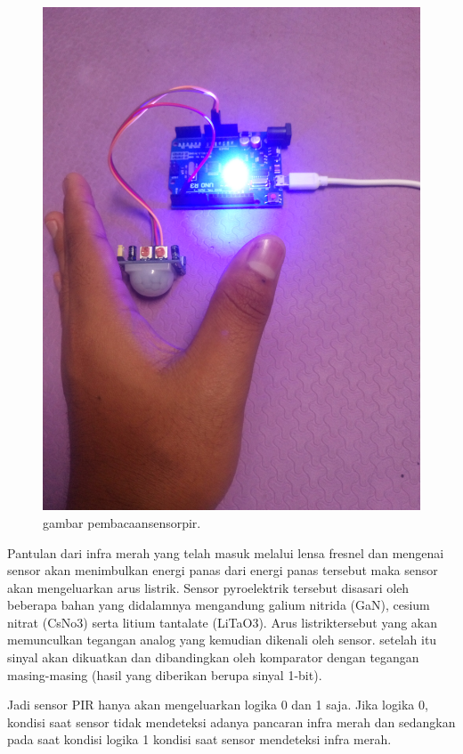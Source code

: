 \documentclass{article}
\begin{document}
\begin{figure}[ht]
\centerline{\includegraphics[width=1\textwidth]{figures/pembacaansensorpir.JPG}}
\caption{gambar pembacaansensorpir.}
\label{pembacaansensorpir.JPG}
\end{figure}

Pantulan dari infra merah yang telah masuk melalui lensa fresnel dan mengenai sensor akan menimbulkan energi panas dari energi panas tersebut maka sensor akan mengeluarkan arus listrik.
Sensor pyroelektrik tersebut disasari oleh beberapa bahan yang didalamnya mengandung galium nitrida (GaN), cesium nitrat (CsNo3) serta litium tantalate (LiTaO3).
Arus listriktersebut yang akan memunculkan tegangan analog yang kemudian dikenali oleh sensor. setelah itu sinyal akan dikuatkan dan dibandingkan oleh komparator dengan tegangan masing-masing (hasil yang diberikan berupa sinyal 1-bit).

Jadi sensor PIR hanya akan mengeluarkan logika 0 dan 1 saja. Jika logika 0, kondisi saat sensor tidak mendeteksi adanya pancaran infra merah dan sedangkan pada saat kondisi logika 1 kondisi saat sensor mendeteksi infra merah.
\end{document}
